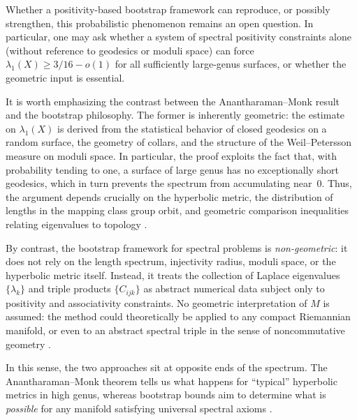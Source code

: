 \documentclass[11pt]{article}
\theoremstyle{plain}
\begin{document}

\medskip

Whether a positivity-based bootstrap framework can reproduce, or possibly
strengthen, this probabilistic phenomenon remains an open question.  In
particular, one may ask whether a system of spectral positivity constraints
alone (without reference to geodesics or moduli space) can force
$\lambda_1(X) \ge 3/16 - o(1)$ for all sufficiently large-genus surfaces, or
whether the geometric input is essential.

\medskip

\noindent
It is worth emphasizing the contrast between the Anantharaman--Monk result and the
bootstrap philosophy.  The former is inherently geometric: the estimate on
$\lambda_1(X)$ is derived from the statistical behavior of closed geodesics on a
random surface, the geometry of collars, and the structure of the Weil--Petersson
measure on moduli space.  In particular, the proof exploits the fact that, with
probability tending to one, a surface of large genus has no exceptionally short
geodesics, which in turn prevents the spectrum from accumulating near~$0$.
Thus, the argument depends crucially on  the hyperbolic metric, the distribution of lengths in the mapping class group orbit, and
 geometric comparison inequalities relating eigenvalues to topology \cite{berger2003panorama}.

\medskip



By contrast, the bootstrap framework for spectral problems is
\emph{non-geometric}: it does not rely on the length spectrum, injectivity
radius, moduli space, or the hyperbolic metric itself.  Instead, it treats the
collection of Laplace eigenvalues $\{\lambda_k\}$ and triple products
$\{C_{ijk}\}$ as abstract numerical data subject only to positivity and associativity
constraints.  No geometric interpretation of $M$ is assumed: the method could
theoretically be applied to any compact Riemannian manifold, or even to an abstract
spectral triple in the sense of noncommutative geometry \cite{Connes94,ConnesRecon}.

\medskip

In this sense, the two approaches sit at opposite ends of the spectrum.
The Anantharaman--Monk theorem tells us what happens for ``typical''
hyperbolic metrics in high genus, whereas bootstrap bounds aim to determine what is
\emph{possible} for any manifold satisfying universal spectral axioms \cite{Bon1,Bon2}.  
\end{document}
